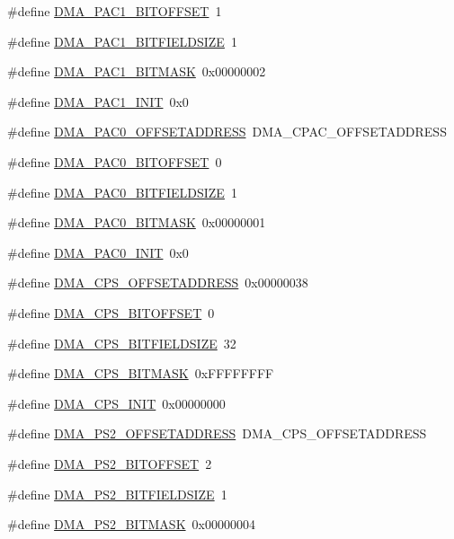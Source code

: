 \begin{DoxyCompactItemize}
\item 
\#define \hyperlink{a00547_a39a9a547f920ef1b2415ce818f0eb851}{DMA\_\-PAC1\_\-BITOFFSET}~1
\item 
\#define \hyperlink{a00547_a3755ff2c8c120d396297191509f57143}{DMA\_\-PAC1\_\-BITFIELDSIZE}~1
\item 
\#define \hyperlink{a00547_a46c1faee347ffe228aa53722623840ad}{DMA\_\-PAC1\_\-BITMASK}~0x00000002
\item 
\#define \hyperlink{a00547_a75e2957dfa1d8e879d082440f009abcb}{DMA\_\-PAC1\_\-INIT}~0x0
\item 
\#define \hyperlink{a00547_a63df217e6567438f3faca9f75ffb0241}{DMA\_\-PAC0\_\-OFFSETADDRESS}~DMA\_\-CPAC\_\-OFFSETADDRESS
\item 
\#define \hyperlink{a00547_a68c0d2ea155f8df33cf9fd72d16afb11}{DMA\_\-PAC0\_\-BITOFFSET}~0
\item 
\#define \hyperlink{a00547_a3a77fe95412ab94a5b83079bb53ef926}{DMA\_\-PAC0\_\-BITFIELDSIZE}~1
\item 
\#define \hyperlink{a00547_a4ee449924178c03e13d18c8c345ce85b}{DMA\_\-PAC0\_\-BITMASK}~0x00000001
\item 
\#define \hyperlink{a00547_af6f5ce2c38878637b9b4f267b6a37e97}{DMA\_\-PAC0\_\-INIT}~0x0
\item 
\#define \hyperlink{a00547_a095941c30599b8102b075d48152ae6bb}{DMA\_\-CPS\_\-OFFSETADDRESS}~0x00000038
\item 
\#define \hyperlink{a00547_aad96f845b4d5d72bbf83b09a3b0dfffb}{DMA\_\-CPS\_\-BITOFFSET}~0
\item 
\#define \hyperlink{a00547_a1da186b1b23199c9bc3486e9f504873a}{DMA\_\-CPS\_\-BITFIELDSIZE}~32
\item 
\#define \hyperlink{a00547_ae0ab8709a990ea2cf47cd89689992122}{DMA\_\-CPS\_\-BITMASK}~0xFFFFFFFF
\item 
\#define \hyperlink{a00547_aa8ddbb7e180bae2401c41b3996bb01a6}{DMA\_\-CPS\_\-INIT}~0x00000000
\item 
\#define \hyperlink{a00547_a4974d5a13dd6c22f59c9ff0ffc881f89}{DMA\_\-PS2\_\-OFFSETADDRESS}~DMA\_\-CPS\_\-OFFSETADDRESS
\item 
\#define \hyperlink{a00547_ae77308ced0668fa34a3cee8c777d42fa}{DMA\_\-PS2\_\-BITOFFSET}~2
\item 
\#define \hyperlink{a00547_acc88795653fbe3cbb2f8b52e4415a11b}{DMA\_\-PS2\_\-BITFIELDSIZE}~1
\item 
\#define \hyperlink{a00547_a98305e718e8fe3559e2d9d0f0d4b70ff}{DMA\_\-PS2\_\-BITMASK}~0x00000004
\item 

\end{DoxyCompactItemize}
